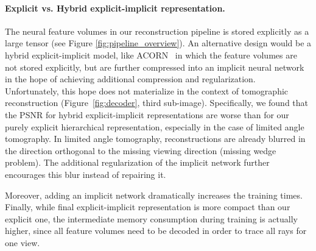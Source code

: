 \documentclass[acmtog,nonacm]{acmart} \acmSubmissionID{0438}
\begin{document}
\paragraph{Explicit vs. Hybrid explicit-implicit representation.}
The neural feature volumes in our reconstruction pipeline is stored
explicitly as a large tensor (see Figure \ref{fig:pipeline_overview}).
An alternative design would be a hybrid explicit-implicit model, like
ACORN~\cite{martel2021acorn} in which the feature volumes are not
stored explicitly, but are further compressed into an implicit neural
network in the hope of achieving additional compression and
regularization. Unfortunately, this hope does not materialize in the
context of tomographic reconstruction (Figure~\ref{fig:decoder}, third
sub-image). Specifically, we found that the PSNR for hybrid
explicit-implicit representations are worse than for our purely
explicit hierarchical representation, especially in the case of
limited angle tomography. In limited angle tomography, reconstructions
are already blurred in the direction orthogonal to the missing viewing
direction (missing wedge problem). The additional regularization of
the implicit network further encourages this blur instead of repairing
it.

Moreover, adding an implicit network dramatically increases the
training times. Finally, while final explicit-implicit representation
is more compact than our explicit one, the intermediate memory
consumption during training is actually higher, since all feature
volumes need to be decoded in order to trace all rays for one view.
\end{document}
